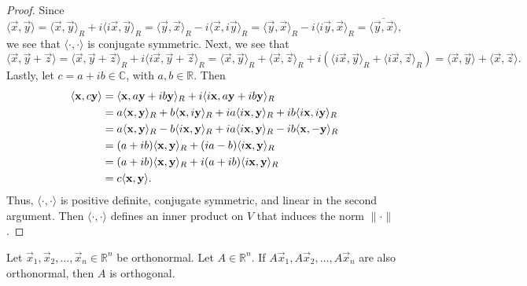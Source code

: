 \documentclass{homework}
\begin{document}
\begin{proof}
		Since
		\begin{equation*}
			\langle \vec{x}, \vec{y}\rangle= \langle\vec{x},\vec{y}\rangle_R + i\langle i\vec{x},\vec{y}\rangle_R = \langle\vec{y},\vec{x}\rangle_R -i\langle\vec{x}, i\vec{y}\rangle_R = \langle \vec{y},\vec{x}\rangle_R - i\langle i\vec{y}, \vec{x}\rangle_R = \overline{\langle\vec{y}, \vec{x}\rangle},
		\end{equation*}
		we see that $\langle\cdot,\cdot\rangle$ is conjugate symmetric. Next, we see that
		\begin{equation*}
			\langle \vec{x}, \vec{y}+\vec{z}\rangle = \langle\vec{x}, \vec{y}+\vec{z}\rangle_R + i\langle i\vec{x}, \vec{y}+\vec{z}\rangle_R = \langle \vec{x},\vec{y}\rangle_R + \langle\vec{x}, \vec{z}\rangle_R + i(\langle i\vec{x}, \vec{y}\rangle_R + \langle i\vec{x},\vec{z}\rangle_R) = \langle\vec{x},\vec{y}\rangle + \langle\vec{x}, \vec{z}\rangle.
		\end{equation*}
		Lastly, let $c = a+ ib \in \mathbb{C}$, with $a,b \in \mathbb{R}$. Then
		\begin{equation*}
		\begin{aligned}
			\langle \mathbf{x}, c\mathbf{y}\rangle &= \langle\mathbf{x}, a\mathbf{y} + ib\mathbf{y}\rangle_R + i\langle i\mathbf{x}, a\mathbf{y} + ib\mathbf{y}\rangle_R \\
			&= a\langle\mathbf{x}, \mathbf{y}\rangle_R + b\langle\mathbf{x},i\mathbf{y}\rangle_R +ia\langle i\mathbf{x},\mathbf{y}\rangle_R + ib\langle i\mathbf{x},i\mathbf{y}\rangle_R \\
			&= a\langle\mathbf{x},\mathbf{y}\rangle_R - b\langle i\mathbf{x}, \mathbf{y}\rangle_R + ia\langle i\mathbf{x}, \mathbf{y}\rangle_R -ib\langle \mathbf{x},-\mathbf{y}\rangle_R \\
			&= (a+ib)\langle \mathbf{x},\mathbf{y}\rangle_R + (ia - b)\langle i\mathbf{x},\mathbf{y}\rangle_R \\
			&= (a+ib)\langle \mathbf{x}, \mathbf{y}\rangle_R + i(a + ib)\langle i\mathbf{x},\mathbf{y}\rangle_R \\
			&= c\langle \mathbf{x},\mathbf{y}\rangle.
		\end{aligned}
		\end{equation*}
		Thus, $\langle\cdot,\cdot\rangle$ is positive definite, conjugate symmetric, and linear in the second argument. Then $\langle\cdot,\cdot\rangle$ defines an inner product on $V$ that induces the norm $\lVert\cdot\rVert$.
	\end{proof}
	
	\question Let $\vec{x}_1,\vec{x}_2, \dots,\vec{x}_n\in\mathbb{R}^n$ be orthonormal. Let $A \in \mathbb{R}^n$. If $A\vec{x}_1, A\vec{x}_2,\dots, A\vec{x}_n$ are also orthonormal, then $A$ is orthogonal.
	
\end{document}
